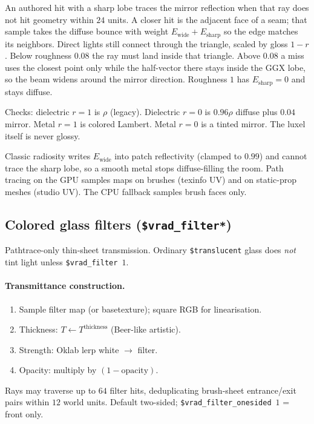 \documentclass[11pt,a4paper]{article}
\newcommand{\vmt}[1]{\texttt{\$#1}}
\begin{document}
An authored hit with a sharp lobe traces the mirror reflection when that ray
does not hit geometry within $24$ units. A closer hit is the adjacent face of a
seam; that sample takes the diffuse bounce with weight $E_{\mathrm{wide}}+E_{\mathrm{sharp}}$
so the edge matches its neighbors. Direct lights still connect through the
triangle, scaled by gloss $1-r$. Below roughness $0.08$ the ray must land inside
that triangle. Above $0.08$ a miss uses the closest point only while the
half-vector there stays inside the GGX lobe, so the beam widens around the
mirror direction. Roughness $1$ has $E_{\mathrm{sharp}}=0$ and stays diffuse.

Checks: dielectric $r{=}1$ is $\rho$ (legacy). Dielectric $r{=}0$ is $0.96\rho$
diffuse plus $0.04$ mirror. Metal $r{=}1$ is colored Lambert. Metal $r{=}0$ is a
tinted mirror. The luxel itself is never glossy.

Classic radiosity writes $E_{\mathrm{wide}}$ into patch reflectivity (clamped to
$0.99$) and cannot trace the sharp lobe, so a smooth metal stops diffuse-filling
the room. Path tracing on the GPU samples maps on brushes (texinfo UV) and on
static-prop meshes (studio UV). The CPU fallback samples brush faces only.

\subsection{Colored glass filters (\vmt{vrad\_filter*})}
\label{sec:filter}

Pathtrace-only thin-sheet transmission. Ordinary \vmt{translucent} glass does
\emph{not} tint light unless \vmt{vrad\_filter}~$1$.

\paragraph{Transmittance construction.}
\begin{enumerate}[leftmargin=1.6em]
  \item Sample filter map (or basetexture); square RGB for linearisation.
  \item Thickness: $T\leftarrow T^{\mathrm{thickness}}$ (Beer-like artistic).
  \item Strength: Oklab lerp white $\to$ filter.
  \item Opacity: multiply by $(1-\mathrm{opacity})$.
\end{enumerate}
Rays may traverse up to $64$ filter hits, deduplicating brush-sheet
entrance/exit pairs within $12$ world units. Default two-sided; \vmt{vrad\_filter\_onesided}~$1$ = front only.
\end{document}
